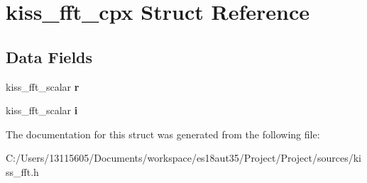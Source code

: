\hypertarget{structkiss__fft__cpx}{}\section{kiss\+\_\+fft\+\_\+cpx Struct Reference}
\label{structkiss__fft__cpx}
\subsection*{Data Fields}
\begin{DoxyCompactItemize}
\item 
\hypertarget{structkiss__fft__cpx_a686b6187e3e885de316908319c71ea8f}{}kiss\+\_\+fft\+\_\+scalar {\bfseries r}\label{structkiss__fft__cpx_a686b6187e3e885de316908319c71ea8f}

\item 
\hypertarget{structkiss__fft__cpx_ac1e17add2ae6b815da29d7d67b03fa70}{}kiss\+\_\+fft\+\_\+scalar {\bfseries i}\label{structkiss__fft__cpx_ac1e17add2ae6b815da29d7d67b03fa70}

\end{DoxyCompactItemize}


The documentation for this struct was generated from the following file\+:\begin{DoxyCompactItemize}
\item 
C\+:/\+Users/13115605/\+Documents/workspace/es18aut35/\+Project/\+Project/sources/kiss\+\_\+fft.\+h\end{DoxyCompactItemize}
